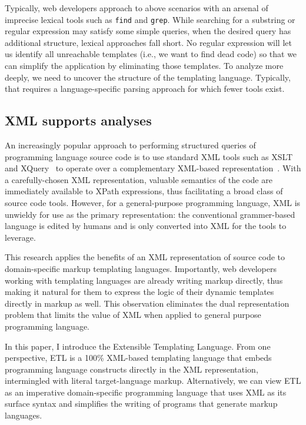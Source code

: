 \documentclass{www2003-submission}
\newcommand{\smtexttt}[1]{{\small\texttt{#1}}}
\begin{document}
Typically, web developers approach to above scenarios with an arsenal
of imprecise lexical tools such as \smtexttt{find} and
\smtexttt{grep}.  While searching for a substring or regular
expression may satisfy some simple queries, when the desired query has
additional structure, lexical approaches fall short.  No regular
expression will let us identify all unreachable templates (i.e., we
want to find dead code) so that we can simplify the application by
eliminating those templates.  To analyze more deeply, we need to
uncover the structure of the templating language.  Typically, that
requires a language-specific parsing approach for which fewer tools
exist.

\subsection{XML supports analyses}

An increasingly popular approach to performing structured queries of
programming language source code is to use standard XML tools such as
XSLT~\cite{XSLT} and XQuery~\cite{XQuery} to operate over a
complementary XML-based representation~\cite{Badros-www9,others}.  With a
carefully-chosen XML representation, valuable semantics of the code
are immediately available to XPath expressions, thus facilitating a
broad class of source code tools.  However, for a general-purpose
programming language, XML is unwieldy for use as the primary
representation: the conventional grammer-based language is edited by
humans and is only converted into XML for the tools to leverage.

This research applies the benefits of an XML representation of source
code to domain-specific markup templating languages.  Importantly,
web developers working with templating languages are already writing
markup directly, thus making it natural for them to express the logic
of their dynamic templates directly in markup as well.  This
observation eliminates the dual representation problem that limits the
value of XML when applied to general purpose programming language.

In this paper, I introduce the Extensible Templating Language.  From
one perspective, ETL is a 100\% XML-based templating language that
embeds programming language constructs directly in the XML
representation, intermingled with literal target-language markup.
Alternatively, we can view ETL as an imperative domain-specific
programming language that uses XML as its surface syntax and
simplifies the writing of programs that generate markup languages.
\end{document}
